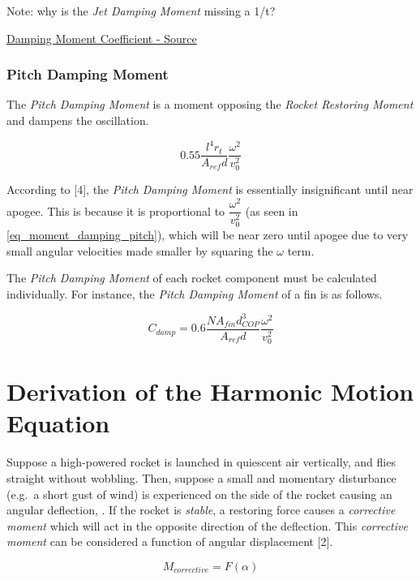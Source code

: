 \documentclass[]{book}
\begin{document}
Note: why is the \emph{Jet Damping Moment} missing a 1/t?

\href{https://www.apogeerockets.com/education/downloads/Newsletter195.pdf}{Damping
Moment Coefficient - Source}

\subsubsection{Pitch Damping Moment}\label{pitch-damping-moment}

The \emph{Pitch Damping Moment} is a moment opposing the \emph{Rocket
Restoring Moment} and dampens the oscillation.

\begin{equation}
\label{eq_moment_damping_pitch}
0.55 \dfrac{l^4 r_t}{A_{ref} d} \dfrac{\omega^2}{v^2_0}
\end{equation}

According to {[}4{]}, the \emph{Pitch Damping Moment} is essentially
insignificant until near apogee. This is because it is proportional to
\(\dfrac{\omega^2}{v^2_0}\) (as seen in \ref{eq_moment_damping_pitch}),
which will be near zero until apogee due to very small angular
velocities made smaller by squaring the \(\omega\) term.

The \emph{Pitch Damping Moment} of each rocket component must be
calculated individually. For instance, the \emph{Pitch Damping Moment}
of a fin is as follows.

\begin{equation}
\label{eq_moment_damping_pitch_fin}
C_{damp} = 0.6 \dfrac{N A_{fin} d_{COP}^3}{A_{ref} d} \dfrac{\omega^2}{v^2_0}
\end{equation}

\section{Derivation of the Harmonic Motion
Equation}\label{derivation-of-the-harmonic-motion-equation}

Suppose a high-powered rocket is launched in quiescent air vertically,
and flies straight without wobbling. Then, suppose a small and momentary
disturbance (e.g.~a short gust of wind) is experienced on the side of
the rocket causing an angular deflection, . If the rocket is
\emph{stable}, a restoring force causes a \emph{corrective moment} which
will act in the opposite direction of the deflection. This
\emph{corrective moment} can be considered a function of angular
displacement {[}2{]}.

\begin{equation}
M_{corrective} = F (\alpha)
\end{equation}
\end{document}
